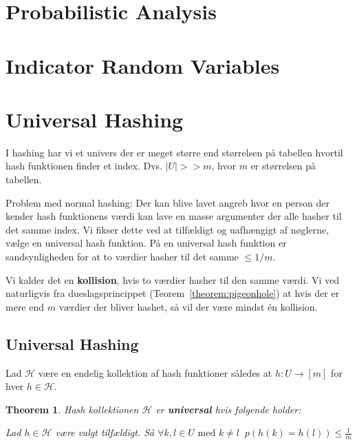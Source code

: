 \documentclass[11pt]{article}
\newtheorem{theorem}{Theorem}
\theoremstyle{definition}
\theoremstyle{remark}
\begin{document}
\section{Probabilistic Analysis}
\label{sec:proban}

\section{Indicator Random Variables}
\label{sec:indicator}

\section{Universal Hashing}
\label{sec:hashing}


I hashing har vi et univers der er meget større end størrelsen på tabellen hvortil hash funktionen finder et index. Dvs. $|U| >> m$, hvor $m$ er størrelsen på tabellen.

Problem med normal hashing: Der kan blive lavet angreb hvor en person der kender hash funktionens værdi kan lave en masse argumenter der alle hasher til det samme index. Vi fikser dette ved at tilfældigt og uafhængigt af nøglerne, vælge en universal hash funktion. På en universal hash funktion er sandsynligheden for at to værdier hasher til det samme $\leq 1/m$.

Vi kalder det en \textbf{kollision}, hvis to værdier hasher til den samme værdi. Vi ved naturligvis fra dueslagsprincippet (Teorem~\ref{theorem:pigeonhole}) at hvis der er mere end $m$ værdier der bliver hashet, så vil der være mindst én kollision. 


\subsection{Universal Hashing}

Lad $\mathcal{H}$ være en endelig kollektion af hash funktioner således at $h : U \rightarrow [m]$  for hver $h \in \mathcal{H}$.

\begin{theorem}
  Hash kollektionen $\mathcal{H}$ er \textbf{universal} hvis følgende holder:

  Lad $h \in \mathcal{H}$ være valgt tilfældigt. Så $\forall k, l \in U \text{ med } k \neq l \; \; p(h(k) = h(l)) \leq \frac{1}{m}$
  \end{theorem}
\end{document}
